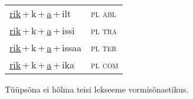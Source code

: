 \begin{minipage}{\textwidth}
\begin{sideways}
\begin{tabular}{l l}
\underline{rik}\,+\,k\,+\,\underline{a}\,+\,ilt & \textsc{ pl abl } \\
\underline{rik}\,+\,k\,+\,\underline{a}\,+\,issi & \textsc{ pl tra } \\
\underline{rik}\,+\,k\,+\,\underline{a}\,+\,issaa & \textsc{ pl ter } \\
\underline{rik}\,+\,k\,+\,\underline{a}\,+\,ika & \textsc{ pl com } \\
\end{tabular}
\end{sideways}
\label{tab:tüüpsõnamall-rikaz}

\end{minipage}

 
\vspace{1em}
\noindent Tüüpsõna ei hõlma teisi lekseeme vormi\-sõnastikus.
